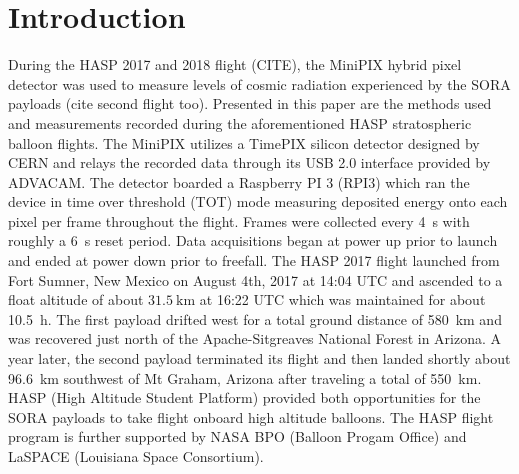 \section{Introduction}
\label{Introduction}

During the HASP 2017\cite{hasp} and 2018 flight (CITE), the MiniPIX hybrid pixel detector\cite{minipix} was used to measure levels of cosmic radiation experienced by the SORA payloads\cite{sora} (cite second flight too). 
%
Presented in this paper are the methods used and measurements recorded during the aforementioned HASP stratospheric balloon flights.
%
The MiniPIX utilizes a TimePIX\cite{timepix} silicon detector designed by CERN\cite{cern} and relays the recorded data through its USB 2.0 interface provided by ADVACAM\cite{advacam}. 
%
The detector boarded a Raspberry PI 3 (RPI3) which ran the device in time over threshold (TOT) mode measuring deposited energy onto each pixel per frame throughout the flight. 
%
Frames were collected every \SI{4}{\second} with roughly a \SI{6}{\second} reset period. 
%
Data acquisitions began at power up prior to launch and ended at power down prior to freefall. 
%
The HASP 2017 flight launched from Fort Sumner, New Mexico on August 4th, 2017 at 14:04 UTC and ascended to a float altitude of about $\SI{31.5}{\kilo\meter}$ at 16:22 UTC which was maintained for about \SI{10.5}{\hour}.
%
 The first payload drifted west for a total ground distance of \SI{580}{\kilo\meter} and was recovered just north of the Apache-Sitgreaves National Forest in Arizona. 
 A year later, the second payload terminated its flight and then landed shortly about \SI{96.6}{\kilo\meter} southwest of Mt Graham, Arizona after traveling a total of \SI{550}{\kilo\meter}.
 HASP (High Altitude Student Platform) provided both opportunities for the SORA payloads to take flight onboard high altitude balloons. The HASP flight program is further supported by NASA BPO (Balloon Progam Office) and LaSPACE (Louisiana Space Consortium).